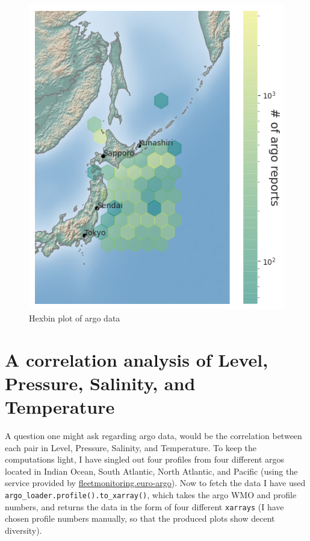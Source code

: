 \documentclass[12pt]{article}
\begin{document}
\begin{figure}
\centering
\includegraphics[scale=0.9]{hexbin_argos_locations.png}
\caption{Hexbin plot of argo data}
\label{hexbin}
\end{figure}

\section{A correlation analysis of Level, Pressure, Salinity, 
and Temperature}

A question one might ask regarding argo data, would be the correlation 
between each pair in Level, 
Pressure, Salinity, and Temperature. To keep the computations light, 
I have singled out four profiles from four different
argos located in Indian Ocean, South Atlantic, North Atlantic, and 
Pacific (using the service provided by 
\href{https://fleetmonitoring.euro-argo.eu/dashboard?Status=Active}{fleetmonitoring.euro-argo}). Now to fetch  
the data I have used \verb|argo_loader.profile().to_xarray()|, which 
takes the argo WMO and profile numbers, and returns the data
in the form of four different \verb|xarrays| (I have chosen profile 
numbers 
manually, so that the produced plots show decent diversity).\\
\end{document}

